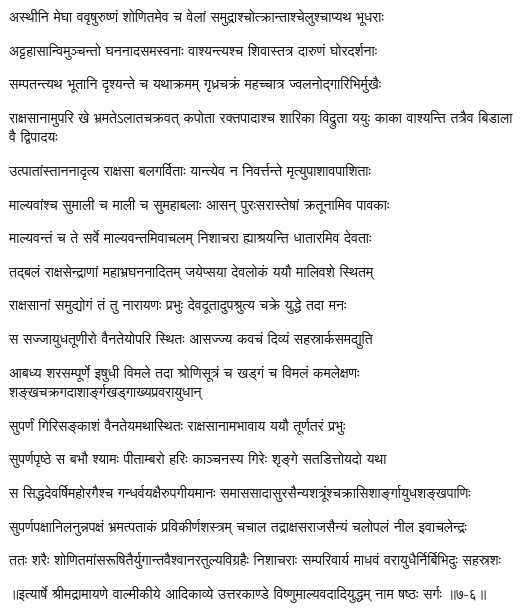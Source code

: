\twolineshloka
{अस्थीनि मेघा ववृषुरुष्णं शोणितमेव च}
{वेलां समुद्राश्चोत्क्रान्ताश्चेलुश्चाप्यथ भूधराः} %

\twolineshloka
{अट्टहासान्विमुञ्चन्तो घननादसमस्वनाः}
{वाश्यन्त्यश्च शिवास्तत्र दारुणं घोरदर्शनाः} %

\twolineshloka
{सम्पतन्त्यथ भूतानि दृश्यन्ते च यथाक्रमम्}
{गृध्रचक्रं महच्चात्र ज्वलनोद्गारिभिर्मुखैः} %

\twolineshloka
{राक्षसानामुपरि खे भ्रमतेऽलातचक्रवत्}
{कपोता रक्तपादाश्च शारिका विद्रुता ययुः काका वाश्यन्ति तत्रैव बिडाला वै द्विपादयः} %

\twolineshloka
{उत्पातांस्ताननादृत्य राक्षसा बलगर्विताः}
{यान्त्येव न निवर्त्तन्ते मृत्युपाशावपाशिताः} %

\twolineshloka
{माल्यवांश्च सुमाली च माली च सुमहाबलाः}
{आसन् पुरःसरास्तेषां क्रतूनामिव पावकाः} %

\twolineshloka
{माल्यवन्तं च ते सर्वे माल्यवन्तमिवाचलम्}
{निशाचरा ह्याश्रयन्ति धातारमिव देवताः} %

\twolineshloka
{तद्बलं राक्षसेन्द्राणां महाभ्रघननादितम्}
{जयेप्सया देवलोकं ययौ मालिवशे स्थितम्} %

\twolineshloka
{राक्षसानां समुद्योगं तं तु नारायणः प्रभुः}
{देवदूतादुपश्रुत्य चक्रे युद्धे तदा मनः} %

\twolineshloka
{स सज्जायुधतूणीरो वैनतेयोपरि स्थितः}
{आसज्ज्य कवचं दिव्यं सहस्रार्कसमद्युति} %

\twolineshloka
{आबध्य शरसम्पूर्णे इषुधी विमले तदा}
{श्रोणिसूत्रं च खड्गं च विमलं कमलेक्षणः शङ्खचक्रगदाशार्ङ्गखड्गाख्यप्रवरायुधान्} %

\twolineshloka
{सुपर्णं गिरिसङ्काशं वैनतेयमथास्थितः}
{राक्षसानामभावाय ययौ तूर्णतरं प्रभुः} %

\twolineshloka
{सुपर्णपृष्ठे स बभौ श्यामः पीताम्बरो हरिः}
{काञ्चनस्य गिरेः शृङ्गे सतडित्तोयदो यथा} %

\twolineshloka
{स सिद्धदेवर्षिमहोरगैश्च गन्धर्वयक्षैरुपगीयमानः}
{समाससादासुरसैन्यशत्रूंश्चक्रासिशार्ङ्गायुधशङ्खपाणिः} %

\twolineshloka
{सुपर्णपक्षानिलनुन्नपक्षं भ्रमत्पताकं प्रविकीर्णशस्त्रम्}
{चचाल तद्राक्षसराजसैन्यं चलोपलं नील इवाचलेन्द्रः} %

\twolineshloka
{ततः शरैः शोणितमांसरूषितैर्युगान्तवैश्वानरतुल्यविग्रहैः}
{निशाचराः सम्परिवार्य माधवं वरायुधैर्निर्बिभिदुः सहस्रशः} %


॥इत्यार्षे श्रीमद्रामायणे वाल्मीकीये आदिकाव्ये उत्तरकाण्डे विष्णुमाल्यवदादियुद्धम् नाम षष्ठः सर्गः ॥७-६॥
